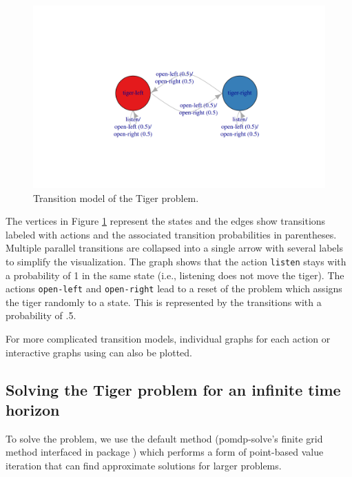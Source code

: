 \begin{figure}
\includegraphics[width=1\linewidth]{pomdp_files/figure-latex/tiger-transition-1} \caption{Transition model of the Tiger problem.}\label{fig:tiger-transition}
\end{figure}

The vertices in Figure \ref{fig:tiger-transition} represent the states and
the edges show transitions labeled with actions and the associated transition probabilities in parentheses. Multiple parallel transitions are
collapsed into a single arrow with several labels to simplify the visualization.
The graph shows that the action \texttt{listen} stays with a probability of 1
in the same state (i.e., listening does not move the tiger). The actions \texttt{open-left} and \texttt{open-right} lead to
a reset of the problem which assigns the tiger randomly to a state. This is represented by the transitions with a
probability of .5.

For more complicated transition models, individual graphs for each action or interactive
graphs using  can also be plotted.

\hypertarget{solving-the-tiger-problem-for-an-infinite-time-horizon}{%
\subsection{Solving the Tiger problem for an infinite time horizon}\label{solving-the-tiger-problem-for-an-infinite-time-horizon}}

To solve the problem, we use the default method (pomdp-solve's finite grid method interfaced
in package )
which performs a form of point-based value iteration that can find
approximate solutions for larger problems.

